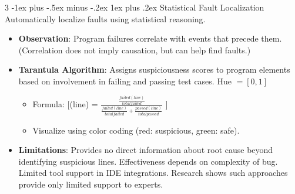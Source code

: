 \documentclass[a4paper, 10pt, landscape]{article}
\makeatletter
\renewcommand{\subsubsection}{\@startsection{subsubsection}{3}{0mm}%
                                {-1ex plus -.5ex minus -.2ex}%
                                {1ex plus .2ex}%
                                {\normalfont\small\bfseries}}
\makeatother
\begin{document}
\begin{multicols*}{3}
\subsubsection{Statistical Fault Localization}
Automatically localize faults using statistical reasoning.
\begin{itemize}
\item \textbf{Observation}: Program failures correlate with events that precede them. (Correlation does not imply causation, but can help find faults.)
\item \textbf{Tarantula Algorithm}: Assigns suspiciousness scores to program elements based on involvement in failing and passing test cases. Hue $= [0,1]$
	\begin{itemize}[itemsep=-1pt]
	\item Formula:	[(line) = $\frac{  \frac{failed(line)}{total failed}  }{\frac{failed(line)}{total failed} + \frac{passed(line)}{total passed}}$	]
	\item Visualize using color coding (red: suspicious, green: safe).
	\end{itemize}
\item \textbf{Limitations}: Provides no direct information about root cause beyond identifying suspicious lines. Effectiveness depends on complexity of bug. Limited tool support in IDE integrations. Research shows such approaches provide only limited support to experts.
\end{itemize}


\end{multicols*}
\end{document}
